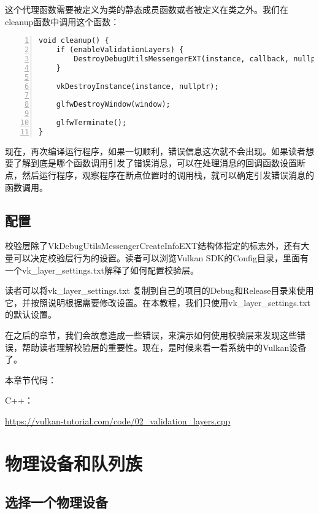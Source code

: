 \documentclass{ctexart}
\begin{document}
这个代理函数需要被定义为类的静态成员函数或者被定义在类之外。我们在cleanup函数中调用这个函数：

\begin{lstlisting}[language={[ANSI]C},keywordstyle=\color{blue!70},commentstyle=\color{red!50!green!50!blue!50},frame=shadowbox, rulesepcolor=\color{red!20!green!20!blue!20},basicstyle=\small,numbers=left, numberstyle=\tiny,breaklines=true]
void cleanup() {
	if (enableValidationLayers) {
		DestroyDebugUtilsMessengerEXT(instance, callback, nullptr);
	}

	vkDestroyInstance(instance, nullptr);

	glfwDestroyWindow(window);

	glfwTerminate();
}
\end{lstlisting}

现在，再次编译运行程序，如果一切顺利，错误信息这次就不会出现。如果读者想要了解到底是哪个函数调用引发了错误消息，可以在处理消息的回调函数设置断点，然后运行程序，观察程序在断点位置时的调用栈，就可以确定引发错误消息的函数调用。

\subsection{配置}

校验层除了VkDebugUtilsMessengerCreateInfoEXT结构体指定的标志外，还有大量可以决定校验层行为的设置。读者可以浏览Vulkan SDK的Config目录，里面有一个vk\_layer\_settings.txt解释了如何配置校验层。

读者可以将vk\_layer\_settings.txt 复制到自己的项目的Debug和Release目录来使用它，并按照说明根据需要修改设置。在本教程，我们只使用vk\_layer\_settings.txt的默认设置。

在之后的章节，我们会故意造成一些错误，来演示如何使用校验层来发现这些错误，帮助读者理解校验层的重要性。现在，是时候来看一看系统中的Vulkan设备了。

本章节代码：

C++：

\url{https://vulkan-tutorial.com/code/02_validation_layers.cpp}

\newpage
\section{物理设备和队列族}

\subsection{选择一个物理设备}
\end{document}
